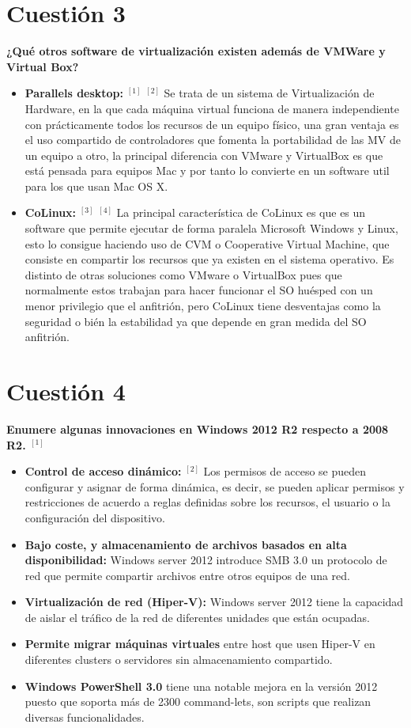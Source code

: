 \documentclass[a4paper, 11pt]{article} %
\begin{document}
\section{Cuestión 3}
\textbf{¿Qué otros software de virtualización existen además de VMWare y Virtual Box?} \\
\begin{itemize}
\item \textbf{Parallels desktop:}
	$^{[1]}$ $^{[2]}$ Se trata de un sistema de Virtualización de Hardware, en la que cada máquina virtual funciona de manera independiente con prácticamente todos los recursos de un equipo físico, una gran ventaja es el uso compartido de controladores que fomenta la portabilidad de las MV de un equipo a otro, la principal diferencia con VMware y VirtualBox es que está pensada para equipos Mac y por tanto lo convierte en un software util para los que usan Mac OS X.
\item \textbf{CoLinux:}
	$^{[3]}$ $^{[4]}$ La principal característica de CoLinux es que es un software que permite ejecutar de forma paralela Microsoft Windows y Linux, esto lo consigue haciendo uso de CVM o Cooperative Virtual Machine, que consiste en compartir los recursos que ya existen en el sistema operativo. Es distinto de otras soluciones como VMware o VirtualBox pues que normalmente estos trabajan para hacer funcionar el SO huésped con un menor privilegio que el anfitrión, pero CoLinux tiene desventajas como la seguridad o bién la estabilidad ya que depende en gran medida del SO anfitrión.
\end{itemize}

\section{Cuestión 4}
\textbf{Enumere algunas innovaciones en Windows 2012 R2 respecto a 2008 R2. $^{[1]}$} \\
\begin{itemize}
\item \textbf{Control de acceso dinámico:} $^{[2]}$ Los permisos de acceso se pueden configurar y asignar de forma dinámica, es decir, se pueden aplicar permisos y restricciones de acuerdo a reglas definidas sobre los recursos, el usuario o la configuración del dispositivo.
\item \textbf{Bajo coste, y almacenamiento de archivos basados en alta disponibilidad:} Windows server 2012 introduce SMB 3.0 un protocolo de red que permite compartir archivos entre otros equipos de una red.
\item \textbf{Virtualización de red (Hiper-V):} Windows server 2012 tiene la capacidad de aislar el tráfico de la red  de diferentes unidades que están ocupadas.
\item \textbf{Permite migrar máquinas virtuales} entre host que usen Hiper-V en diferentes clusters o servidores sin almacenamiento compartido.
\item \textbf{Windows PowerShell 3.0} tiene una notable mejora en la versión 2012 puesto que soporta más de 2300 command-lets, son scripts que realizan diversas funcionalidades.
\end{itemize}
\end{document}
